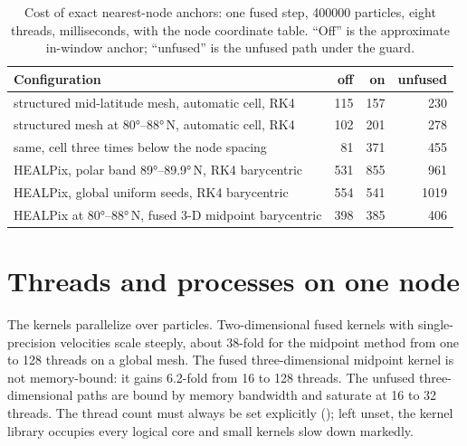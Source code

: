 \begin{table}[t]
\centering\small
\caption{Cost of exact nearest-node anchors: one fused step, \num{400000} particles, eight threads,
milliseconds, with the node coordinate table. ``Off'' is the approximate in-window anchor; ``unfused''
is the unfused path under the guard.}
\label{tab:perf-guard}
\begin{tabular}{@{}lrrr@{}}
\toprule
Configuration & off & on & unfused \\
\midrule
structured mid-latitude mesh, automatic cell, RK4 & 115 & 157 & 230 \\
structured mesh at \ang{80}--\ang{88}\,N, automatic cell, RK4 & 102 & 201 & 278 \\
same, cell three times below the node spacing & 81 & 371 & 455 \\
HEALPix, polar band \ang{89}--\ang{89.9}\,N, RK4 barycentric & 531 & 855 & 961 \\
HEALPix, global uniform seeds, RK4 barycentric & 554 & 541 & 1019 \\
HEALPix at \ang{80}--\ang{88}\,N, fused 3-D midpoint barycentric & 398 & 385 & 406 \\
\bottomrule
\end{tabular}
\end{table}


\section{Threads and processes on one node}\label{sec:perf-threads}

The kernels parallelize over particles. Two-dimensional fused kernels with single-precision
velocities scale steeply, about 38-fold for the midpoint method from one to 128 threads on a global
mesh. The fused three-dimensional midpoint kernel is not memory-bound: it gains 6.2-fold from 16 to
128 threads. The unfused three-dimensional paths are bound by memory bandwidth and saturate at 16 to
32 threads. The thread count must always be set explicitly (); left
unset, the kernel library occupies every logical core and small kernels slow down markedly.

